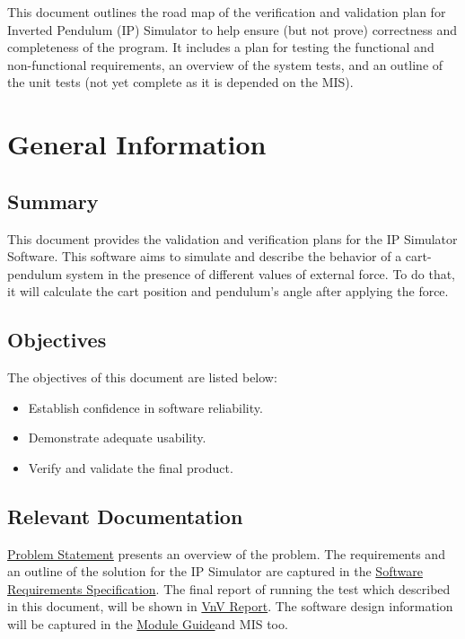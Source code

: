 \documentclass[12pt, titlepage]{article}
\begin{document}

This document outlines the road map of the verification and validation plan for Inverted Pendulum (IP) Simulator to help ensure (but not prove) correctness and completeness of the program.
It includes a plan for testing the functional and non-functional requirements, an overview of the system tests, and an outline of the unit tests (not yet complete as it is depended on the MIS).

\section{General Information}

\subsection{Summary}
This document provides the validation and verification plans for the IP Simulator Software. This software aims to simulate and describe the behavior of a cart-pendulum system in the presence of different values of external force. To do that, it will calculate the cart position and pendulum's angle after applying the force.
\subsection{Objectives}

The objectives of this document are listed below:
\begin{itemize}
\item Establish confidence in software reliability.
\item Demonstrate adequate usability.
\item Verify and validate the final product.
\end{itemize}

\subsection{Relevant Documentation}

\href{https://github.com/MinMah23/CAS741-Project/tree/main/docs/ProblemStatementAndGoals/ProblemStatement.pdf}{Problem Statement} presents an overview of the problem.
The requirements and an outline of the solution for the IP Simulator are captured in the \href{https://github.com/MinMah23/CAS741-Project/tree/main/docs/SRS/SRS.pdf}{Software Requirements Specification}.
The final report of running the test which described in this document, will be shown in \href{https://github.com/Maryamvalian/project741/blob/main/docs/VnVReport/VnVReport.pdf}{VnV Report}.
The software design information will be captured in the \href{https://github.com/MinMah23/CAS741-Project/tree/main/docs/Design}{Module Guide}and MIS too.
\end{document}
